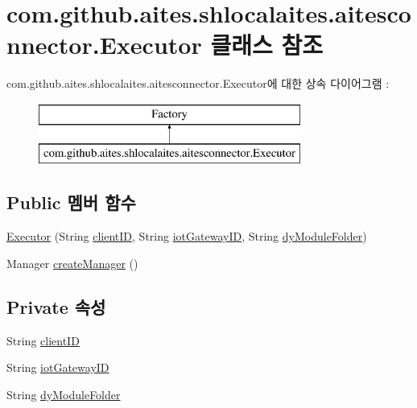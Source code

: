 \hypertarget{classcom_1_1github_1_1aites_1_1shlocalaites_1_1aitesconnector_1_1_executor}{}\section{com.\+github.\+aites.\+shlocalaites.\+aitesconnector.\+Executor 클래스 참조}
\label{classcom_1_1github_1_1aites_1_1shlocalaites_1_1aitesconnector_1_1_executor}
com.\+github.\+aites.\+shlocalaites.\+aitesconnector.\+Executor에 대한 상속 다이어그램 \+: \begin{figure}[H]
\begin{center}
\leavevmode
\includegraphics[height=2.000000cm]{classcom_1_1github_1_1aites_1_1shlocalaites_1_1aitesconnector_1_1_executor}
\end{center}
\end{figure}
\subsection*{Public 멤버 함수}
\begin{DoxyCompactItemize}
\item 
\mbox{\hyperlink{classcom_1_1github_1_1aites_1_1shlocalaites_1_1aitesconnector_1_1_executor_ade1fa391f55b662daac15fae51b98dda}{Executor}} (String \mbox{\hyperlink{classcom_1_1github_1_1aites_1_1shlocalaites_1_1aitesconnector_1_1_executor_a1f8892f17413f1001a35650585deb2c6}{client\+ID}}, String \mbox{\hyperlink{classcom_1_1github_1_1aites_1_1shlocalaites_1_1aitesconnector_1_1_executor_ac83ca28f1a24d45b2e4f1890fc9f8491}{iot\+Gateway\+ID}}, String \mbox{\hyperlink{classcom_1_1github_1_1aites_1_1shlocalaites_1_1aitesconnector_1_1_executor_a071d3608be94d2e9f089119d191a3aa1}{dy\+Module\+Folder}})
\item 
Manager \mbox{\hyperlink{classcom_1_1github_1_1aites_1_1shlocalaites_1_1aitesconnector_1_1_executor_a22f395c905fdb7efe7722646b8dc5f81}{create\+Manager}} ()
\end{DoxyCompactItemize}
\subsection*{Private 속성}
\begin{DoxyCompactItemize}
\item 
String \mbox{\hyperlink{classcom_1_1github_1_1aites_1_1shlocalaites_1_1aitesconnector_1_1_executor_a1f8892f17413f1001a35650585deb2c6}{client\+ID}}
\item 
String \mbox{\hyperlink{classcom_1_1github_1_1aites_1_1shlocalaites_1_1aitesconnector_1_1_executor_ac83ca28f1a24d45b2e4f1890fc9f8491}{iot\+Gateway\+ID}}
\item 
String \mbox{\hyperlink{classcom_1_1github_1_1aites_1_1shlocalaites_1_1aitesconnector_1_1_executor_a071d3608be94d2e9f089119d191a3aa1}{dy\+Module\+Folder}}
\end{DoxyCompactItemize}


